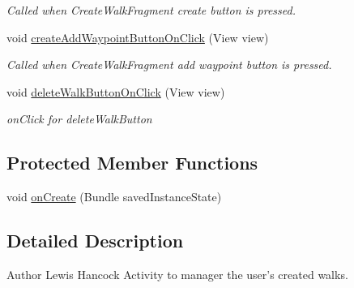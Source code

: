 \begin{DoxyCompactItemize}
\begin{DoxyCompactList}\small\item\em Called when Create\+Walk\+Fragment create button is pressed. \end{DoxyCompactList}\item 
void \hyperlink{classuk_1_1ac_1_1swan_1_1digitaltrails_1_1activities_1_1_my_walks_activity_a248e237d3d0746d5da2d37906bb51741}{create\+Add\+Waypoint\+Button\+On\+Click} (View view)
\begin{DoxyCompactList}\small\item\em Called when Create\+Walk\+Fragment add waypoint button is pressed. \end{DoxyCompactList}\item 
void \hyperlink{classuk_1_1ac_1_1swan_1_1digitaltrails_1_1activities_1_1_my_walks_activity_ab39c63d4397d050d178607f43ea792b8}{delete\+Walk\+Button\+On\+Click} (View view)
\begin{DoxyCompactList}\small\item\em on\+Click for delete\+Walk\+Button \end{DoxyCompactList}\end{DoxyCompactItemize}
\subsection*{Protected Member Functions}
\begin{DoxyCompactItemize}
\item 
void \hyperlink{classuk_1_1ac_1_1swan_1_1digitaltrails_1_1activities_1_1_my_walks_activity_aa1af7616643652f014ab778c0c9fe218}{on\+Create} (Bundle saved\+Instance\+State)
\end{DoxyCompactItemize}


\subsection{Detailed Description}
\begin{DoxyAuthor}{Author}
Lewis Hancock Activity to manager the user's created walks. 
\end{DoxyAuthor}


